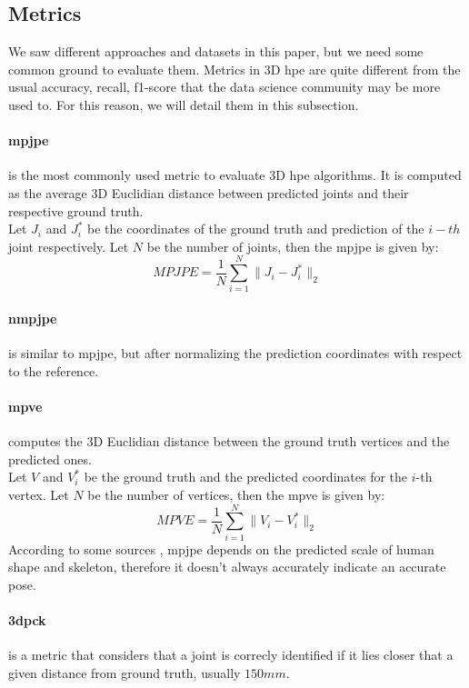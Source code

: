 \documentclass[runningheads]{llncs}
\begin{document}
\subsection{Metrics}
We saw different approaches and datasets in this paper, but we need some common ground to evaluate them. Metrics in 3D \ac{hpe} are quite different from the usual accuracy, recall, f1-score that the data science community may be more used to. For this reason, we will detail them in this subsection.
\paragraph{\ac{mpjpe}} is the most commonly used metric to evaluate 3D \ac{hpe} algorithms. It is computed as the average 3D Euclidian distance between predicted joints and their respective ground truth. \\
Let $J_i$ and $J_i^*$ be the coordinates of the ground truth and prediction of the $i-th$ joint respectively. Let $N$ be the number of joints, then the \ac{mpjpe} is given by:
\begin{equation}
  MPJPE = \frac{1}{N} \sum_{i=1}^N \|J_i - J_i^*\|_2
\end{equation}

\paragraph{\ac{nmpjpe}} is similar to \ac{mpjpe}, but after normalizing the prediction coordinates with respect to the reference.

\paragraph{\ac{mpve}} computes the 3D Euclidian distance between the ground truth vertices and the predicted ones. \\
Let $V$ and $V_i^*$ be the ground truth and the predicted coordinates for the $i$-th vertex. Let $N$ be the number of vertices, then the \ac{mpve} is given by:
\begin{equation}
  MPVE = \frac{1}{N} \sum_{i=1}^N \|V_i - V_i^*\|_2
\end{equation}
According to some sources \cite{survey}, \ac{mpjpe} depends on the predicted scale of human shape and skeleton, therefore it doesn't always accurately indicate an accurate pose.

\paragraph{\ac{3dpck}} is a metric that considers that a joint is correcly identified if it lies closer that a given distance from ground truth, usually $150mm$.
\end{document}

